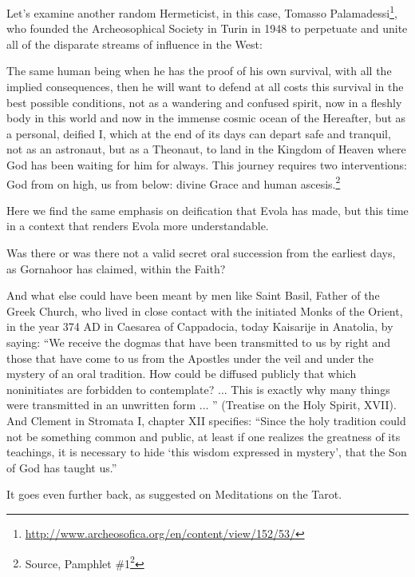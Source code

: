 Let's examine another random Hermeticist, in this case, Tomasso Palamadessi\footnote{\url{http://www.archeosofica.org/en/content/view/152/53/}}, who founded the Archeosophical Society in Turin in 1948 to perpetuate and unite all of the disparate streams of influence in the West:

\begin{quotex}
The same human being when he has the proof of his own survival, with all the implied consequences, then he will want to defend at all costs this survival in the best possible conditions, not as a wandering and confused spirit, now in a fleshly body in this world and now in the immense cosmic ocean of the Hereafter, but as a personal, deified I, which at the end of its days can depart safe and tranquil, not as an astronaut, but as a Theonaut, to land in the Kingdom of Heaven where God has been waiting for him for always. This journey requires two interventions: God from on high, us from below: divine Grace and human ascesis.\footnote{Source, Pamphlet \#1\footnote{\url{http://www.archeosofica.org/en/content/view/152/53/}}}
\end{quotex}

Here we find the same emphasis on deification that Evola has made, but this time in a context that renders Evola more understandable.

Was there or was there not a valid secret oral succession from the earliest days, as Gornahoor has claimed, within the Faith?

\begin{quotex}
And what else could have been meant by men like Saint Basil, Father of the Greek Church, who lived in close contact with the initiated Monks of the Orient, in the year 374 AD in Caesarea of Cappadocia, today Kaisarije in Anatolia, by saying: ``We receive the dogmas that have been transmitted to us by right and those that have come to us from the Apostles under the veil and under the mystery of an oral tradition. How could be diffused publicly that which noninitiates are forbidden to contemplate? ... This is exactly why many things were transmitted in an unwritten form ... '' (Treatise on the Holy Spirit, XVII). And Clement in Stromata I, chapter XII specifies: ``Since the holy tradition could not be something common and public, at least if one realizes the greatness of its teachings, it is necessary to hide `this wisdom expressed in mystery', that the Son of God has taught us.''
\end{quotex}


It goes even further back, as suggested on Meditations on the Tarot.

